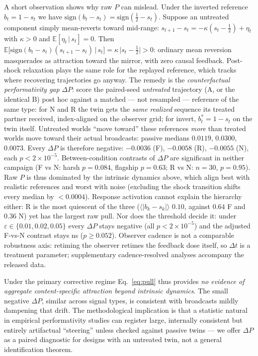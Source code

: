 \documentclass{svproc}
\begin{document}
A short observation shows why raw $P$ can mislead. Under the inverted
reference $b_t=1-s_t$ we have
$\mathrm{sign}(b_t-s_t)=\mathrm{sign}(\tfrac12-s_t)$. Suppose an untreated
component simply mean-reverts toward mid-range:
$s_{t+1}-s_t=-\kappa(s_t-\tfrac12)+\eta_t$ with $\kappa>0$ and
$\mathbb{E}[\eta_t\,|\,s_t]=0$. Then
$\mathbb{E}[\mathrm{sign}(b_t-s_t)(s_{t+1}-s_t)\,|\,s_t]
=\kappa\,|s_t-\tfrac12|>0$: ordinary mean reversion masquerades as
attraction toward the mirror, with zero causal feedback. Post-shock
relaxation plays the same role for the replayed reference, which tracks where
recovering trajectories go anyway. The remedy is the \emph{counterfactual
performativity gap} $\Delta P$: score the paired-seed \emph{untreated}
trajectory (A, or the identical B) post hoc against a matched --- not
resampled --- reference of the same type: for N and R the twin gets the
\emph{same realized} sequence its treated partner received, index-aligned on
the observer grid; for invert, $b^\ast_t=1-s_t$ on the twin itself.
Untreated worlds ``move toward'' these references \emph{more} than
treated worlds move toward their actual broadcasts: passive medians $0.0119$,
$0.0300$, $0.0073$. Every $\Delta P$ is therefore negative: $-0.0036$ (F), $-0.0058$ (R),
$-0.0055$ (N), each $p\!<\!2\times10^{-5}$. Between-condition contrasts of
$\Delta P$ are significant in neither campaign (F vs N: harsh $p=0.084$,
flagship $p=0.63$; R vs N: $n{=}30$, $p=0.95$). Raw $P$ is thus dominated by the
intrinsic dynamics above, which align best with realistic references and worst
with noise (excluding the shock transition shifts every median by
$<\!0.0004$).
Response activation cannot explain the hierarchy either: R is the most
quiescent of the three ($\langle|b_k-s_k|\rangle$ $0.10$, against $0.64$ F
and $0.36$ N) yet has the largest raw pull. Nor does the threshold decide it:
under $\varepsilon\in\{0.01,0.02,0.05\}$ every $\Delta P$ stays negative (all
$p<2\times10^{-5}$) and the adjusted F-vs-N contrast stays ns ($p\geq0.052$).
Observer cadence is not a comparable robustness axis: retiming the observer
retimes the feedback dose itself, so $\Delta t$ is a treatment parameter;
supplementary cadence-resolved analyses accompany the released data.

Under the primary corrective regime Eq.~\ref{eq:pull} thus provides \emph{no
evidence of aggregate content-specific attraction beyond intrinsic dynamics}.
The small negative $\Delta P$, similar across signal types, is consistent with
broadcasts mildly dampening that drift. The methodological implication is
that a statistic natural in empirical performativity studies can register
large, internally consistent but entirely artifactual ``steering'' unless checked
against passive twins --- we offer $\Delta P$ as a paired diagnostic for
designs with an untreated twin, not a general identification theorem.
\end{document}
